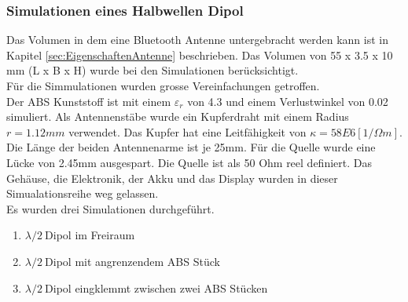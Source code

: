 %
%
%
%
%
%
%
%

\newpage
\subsubsection{Simulationen eines Halbwellen Dipol}

Das Volumen in dem eine Bluetooth Antenne untergebracht werden kann ist in Kapitel \ref{sec:EigenschaftenAntenne} beschrieben. Das Volumen von 55 x 3.5 x 10 mm (L x B x H) wurde bei den Simulationen berücksichtigt. \\
Für die Simmulationen wurden grosse Vereinfachungen getroffen.\\
Der ABS Kunststoff ist mit einem $\varepsilon_r $ von 4.3 und einem Verlustwinkel von 0.02 simuliert. Als Antennenstäbe wurde ein  Kupferdraht mit einem Radius $r = 1.12 mm$ verwendet. Das Kupfer hat eine Leitfähigkeit von $\kappa=58E6 [1/\Omega m]$. Die Länge der beiden Antennenarme ist je 25mm. Für die Quelle wurde eine Lücke von 2.45mm ausgespart. Die Quelle ist als 50 Ohm reel definiert. Das Gehäuse, die Elektronik, der Akku und das Display wurden in dieser Simualationsreihe weg gelassen.\\ 
Es wurden drei Simulationen durchgeführt.
\begin{enumerate}
\item  $\lambda/2 \ $Dipol im Freiraum
\item  $\lambda/2 \ $Dipol mit angrenzendem ABS Stück
\item  $\lambda/2 \ $Dipol eingklemmt zwischen zwei ABS Stücken
\end{enumerate}

